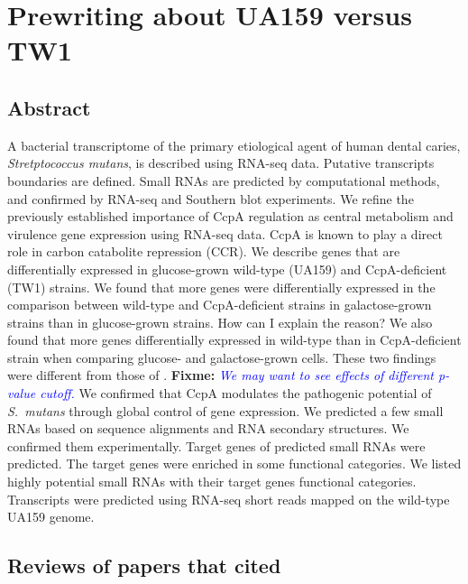 \documentclass{article}
\newcommand{\fixme}[1]{{\textbf{Fixme:} \textit{\textcolor{blue}{#1}}}}
\begin{document}
\doublespacing

\section{Prewriting about UA159 versus TW1}

\subsection{Abstract}
A bacterial transcriptome of the primary etiological agent of human dental caries,
\textit{Stretptococcus mutans}, is described using RNA-seq data. Putative
transcripts boundaries are defined. Small RNAs are predicted by computational
methods, and confirmed by RNA-seq and Southern blot experiments. We refine the
previously established importance of CcpA regulation as central metabolism and
virulence gene expression using RNA-seq data.
CcpA is known to play a direct role in carbon catabolite repression (CCR).
We describe genes that are differentially expressed in glucose-grown wild-type
(UA159) and CcpA-deficient (TW1) strains. We found that more
genes were differentially expressed in the comparison between wild-type and
CcpA-deficient strains in galactose-grown strains than in
glucose-grown strains. How can I explain the reason?
We also found that more genes differentially expressed in wild-type than in
CcpA-deficient strain when comparing glucose- and galactose-grown cells. These
two findings were different from those of \cite{Abranches2008}. \fixme{We may
want to see effects of different p-value cutoff.} We confirmed that CcpA
modulates the pathogenic potential of \textit{S.\ mutans} through global control
of gene expression.
We predicted a few small RNAs based on sequence alignments and RNA secondary
structures. We confirmed them experimentally. Target genes of predicted small
RNAs were predicted. The target genes were enriched in some functional
categories. We listed highly potential small RNAs with their target genes
functional categories. 
Transcripts were predicted using RNA-seq short reads mapped on the wild-type
UA159 genome. 

\subsection{Reviews of papers that cited \cite{Abranches2008}}
\end{document}
